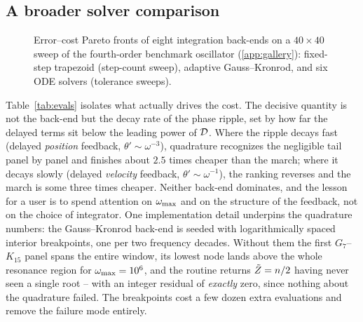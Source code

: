 \subsection{A broader solver comparison}\label{sec:performance-zoo}

\begin{figure}[tb]
  \centering
  \caption{Error--cost Pareto fronts of eight integration back-ends on a
  $40\times40$ sweep of the fourth-order benchmark oscillator
  (\ref{app:gallery}): fixed-step trapezoid (step-count sweep),
  adaptive Gauss--Kronrod, and six ODE solvers (tolerance
  sweeps).}\label{fig:zoo}
\end{figure}

\begin{table}[tb]
  \centering
  \caption{Evaluations of $\Dfun$ needed for one parameter point at
  tol~$=10^{-5}$, with the count of each entry verified against a
  tight-tolerance reference before being recorded. What governs the cost is
  how fast the delay-induced ripple of $\theta'$ decays, i.e.\ how far the
  delayed terms sit below the leading power: $\omega^{-1}$ for the
  velocity-feedback showcase, $\omega^{-3}$ for the fourth-order
  position-feedback benchmark.}\label{tab:evals}
\end{table}

Table~\ref{tab:evals} isolates what actually drives the cost. The decisive
quantity is not the back-end but the decay rate of the phase ripple, set by
how far the delayed terms sit below the leading power of $\Dfun$. Where the
ripple decays fast (delayed \emph{position} feedback,
$\theta'\sim\omega^{-3}$), quadrature recognizes the negligible tail panel
by panel and finishes about $2.5$ times cheaper than the march; where it
decays slowly (delayed \emph{velocity} feedback, $\theta'\sim\omega^{-1}$),
the ranking reverses and the march is some three times cheaper. Neither
back-end dominates, and the lesson for a user is to spend attention on
$\omega_{\mathrm{max}}$ and on the structure of the feedback, not on the choice of
integrator. One implementation detail underpins the quadrature numbers: the
Gauss--Kronrod back-end is seeded with logarithmically spaced interior
breakpoints, one per two frequency decades. Without them the first
$G_7$--$K_{15}$ panel spans the entire window, its lowest node lands above
the whole resonance region for $\omega_{\mathrm{max}}=10^{6}$, and the routine returns
$\tilde{Z}=n/2$ having never seen a single root -- with an integer residual of
\emph{exactly} zero, since nothing about the quadrature failed. The
breakpoints cost a few dozen extra evaluations and remove the failure mode
entirely.

